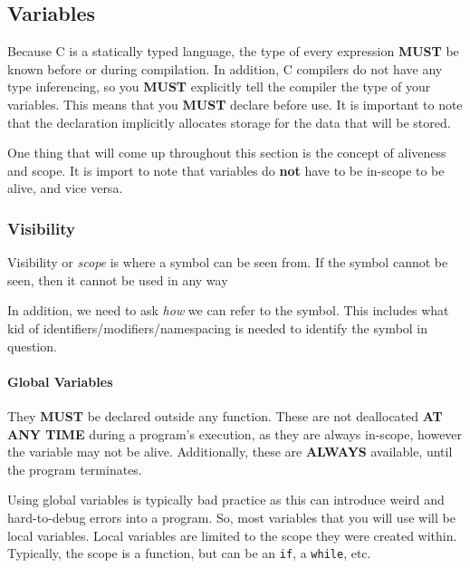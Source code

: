 



\subsection{Variables}\label{subsec:Variables}
Because C is a statically typed language, the type of every expression \textbf{MUST} be known before or during compilation.
In addition, C compilers do not have any type inferencing, so you \textbf{MUST} explicitly tell the compiler the type of your variables.
This means that you \textbf{MUST} declare before use.
It is important to note that the declaration implicitly allocates storage for the data that will be stored.

One thing that will come up throughout this section is the concept of aliveness and scope.
It is import to note that variables do \textbf{not} have to be in-scope to be alive, and vice versa.

\subsubsection{Visibility}\label{subsubsec:Variable_Visibility}
Visibility or \emph{scope} is where a symbol can be seen from.
If the symbol cannot be seen, then it cannot be used in any way

In addition, we need to ask \textit{how} we can refer to the symbol.
This includes what kid of identifiers/modifiers/namespacing is needed to identify the symbol in question.

\paragraph{Global Variables}\label{par:Global_Variables}
They \textbf{MUST} be declared outside any function.
These are not deallocated \textbf{AT ANY TIME} during a program's execution, as they are always in-scope, however the variable may not be alive.
Additionally, these are \textbf{ALWAYS} available, until the program terminates.

Using global variables is typically bad practice as this can introduce weird and hard-to-debug errors into a program.
So, most variables that you will use will be local variables.
Local variables are limited to the scope they were created within.
Typically, the scope is a function, but can be an \texttt{if}, a \texttt{while}, etc.

